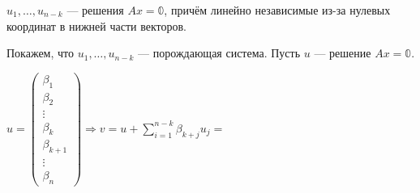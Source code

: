 \documentclass[twoside]{book}
\begin{document}
\begin{itemize}
          \(u_1, \ldots, u_{n - k}\) --- решения \(Ax = \mathbb{0}\), причём линейно независимые из-за нулевых координат в нижней части векторов.

          Покажем, что \(u_1, \ldots, u_{n - k}\) --- порождающая система. Пусть \(u\) --- решение \(Ax = \mathbb{0}\).

          \(u =
          \begin{pmatrix}
              \beta_1       \\
              \beta_2       \\
              \vdots        \\
              \beta_k       \\
              \beta_{k + 1} \\
              \vdots        \\
              \beta_n
          \end{pmatrix} \Rightarrow v = u + \sum\limits_{i = 1}^{n - k} \beta_{k + j} u_j =\)


\end{itemize}
\end{document}
